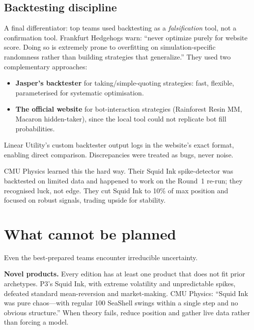 \subsection{Backtesting discipline}
\label{sec:backtest_discipline}

A final differentiator: top teams used backtesting as a
\emph{falsification} tool, not a confirmation tool.  Frankfurt
Hedgehogs warn: ``never optimize purely for website score.  Doing
so is extremely prone to overfitting on simulation-specific
randomness rather than building strategies that generalize.''
They used two complementary approaches:

\begin{itemize}
  \item \textbf{Jasper's backtester} for taking/simple-quoting
        strategies: fast, flexible, parameterised for systematic
        optimisation.
  \item \textbf{The official website} for bot-interaction
        strategies (Rainforest Resin MM, Macaron hidden-taker),
        since the local tool could not replicate bot fill
        probabilities.
\end{itemize}

Linear Utility's custom backtester output logs in the website's
exact format, enabling direct comparison.  Discrepancies were
treated as bugs, never noise.

CMU Physics learned this the hard way.  Their Squid Ink
spike-detector was backtested on limited data and happened to
work on the Round~1 re-run; they recognised luck, not edge.
They cut Squid Ink to 10\% of max position and focused on robust
signals, trading upside for stability.


\section{What cannot be planned}
\label{sec:cannot_plan}

Even the best-prepared teams encounter irreducible uncertainty.

\textbf{Novel products.}  Every edition has at least one product
that does not fit prior archetypes.  P3's Squid Ink, with extreme
volatility and unpredictable spikes, defeated standard
mean-reversion and market-making.  CMU Physics: ``Squid Ink was
pure chaos---with regular 100 SeaShell swings within a single step
and no obvious structure.''  When theory fails, reduce position
and gather live data rather than forcing a model.


